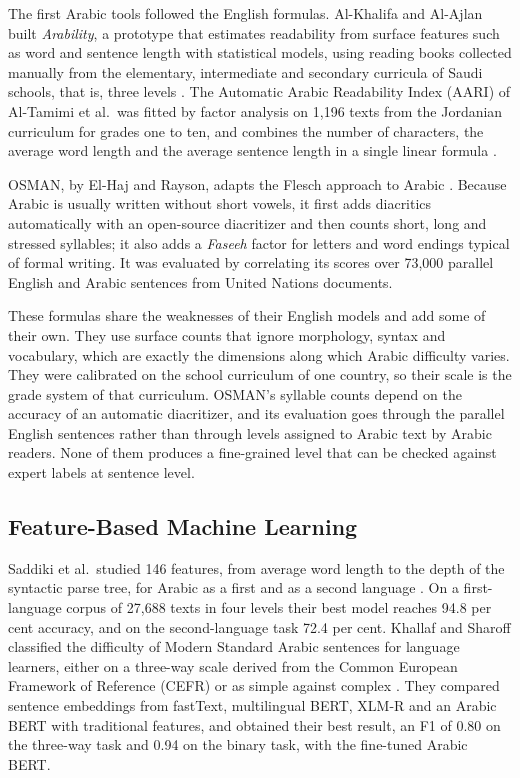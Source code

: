 The first Arabic tools followed the English formulas. Al-Khalifa and Al-Ajlan built
\emph{Arability}, a prototype that estimates readability from surface features such as word and
sentence length with statistical models, using reading books collected manually from the
elementary, intermediate and secondary curricula of Saudi schools, that is, three levels
\cite{al2010automatic}. The Automatic Arabic Readability Index (AARI) of Al-Tamimi et al.\ was
fitted by factor analysis on 1{,}196 texts from the Jordanian curriculum for grades one to ten,
and combines the number of characters, the average word length and the average sentence length
in a single linear formula \cite{altamimi2014aari}.

OSMAN, by El-Haj and Rayson, adapts the Flesch approach to Arabic
\cite{elhaj2016osman}. Because Arabic is usually written without short vowels, it first adds
diacritics automatically with an open-source diacritizer and then counts short, long and stressed
syllables; it also adds a \emph{Faseeh} factor for letters and word endings typical of formal
writing. It was evaluated by correlating its scores over 73{,}000 parallel English and Arabic
sentences from United Nations documents.

These formulas share the weaknesses of their English models and add some of their own. They use
surface counts that ignore morphology, syntax and vocabulary, which are exactly the dimensions
along which Arabic difficulty varies. They were calibrated on the school curriculum of one
country, so their scale is the grade system of that curriculum. OSMAN's syllable counts depend on
the accuracy of an automatic diacritizer, and its evaluation goes through the parallel English
sentences rather than through levels assigned to Arabic text by Arabic readers. None of them produces
a fine-grained level that can be checked against expert labels at sentence level.

\subsection{Feature-Based Machine Learning}

Saddiki et al.\ studied 146 features, from average word length to the depth of the syntactic
parse tree, for Arabic as a first and as a second language \cite{saddiki2018feature}. On a
first-language corpus of 27{,}688 texts in four levels their best model reaches 94.8 per cent
accuracy, and on the second-language task 72.4 per cent. Khallaf and Sharoff classified the
difficulty of Modern Standard Arabic sentences for language learners, either on a three-way scale
derived from the Common European Framework of Reference (CEFR) or as simple against complex
\cite{khallaf2021automatic}. They compared sentence embeddings from fastText, multilingual BERT,
XLM-R and an Arabic BERT with traditional features, and obtained their best result, an F1 of
0.80 on the three-way task and 0.94 on the binary task, with the fine-tuned Arabic BERT.

